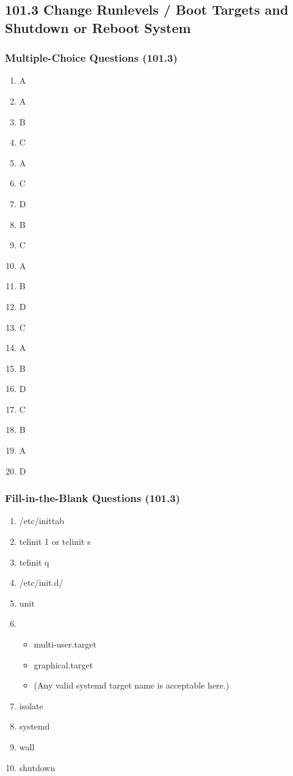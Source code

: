 \documentclass[12pt,a4paper]{report}
\begin{document}
    \subsection*{101.3 Change Runlevels / Boot Targets and Shutdown or Reboot System}
    \subsubsection*{Multiple-Choice Questions (101.3)}
    \begin{enumerate}[1.]
    \item A
    \item A
    \item B
    \item C
    \item A
    \item C
    \item D
    \item B
    \item C
    \item A
    \item B
    \item D
    \item C
    \item A
    \item B
    \item D
    \item C
    \item B
    \item A
    \item D
    \end{enumerate}

\subsubsection*{Fill-in-the-Blank Questions (101.3)}
    \begin{enumerate}[1.]
    \item /etc/inittab
    \item telinit 1 or telinit s
    \item telinit q
    \item /etc/init.d/
    \item unit
    \item 
        \begin{itemize}
            \item multi-user.target
            \item graphical.target
            \item (Any valid systemd target name is acceptable here.)
        \end{itemize}
    \item isolate
    \item systemd
    \item wall
    \item shutdown
    \end{enumerate}
\end{document}
